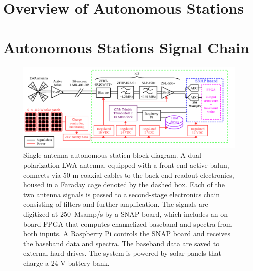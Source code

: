         \subsection{}
        \subsection{}
        
        
\newpage
    \section{Overview of Autonomous Stations}
    \section{Autonomous Stations Signal Chain}
    
    \begin{figure}
    	\begin{center}
    		\includegraphics[width=\linewidth]{Figures/albatros_single_schematic.pdf}
    		\caption{Single-antenna autonomous station block diagram.  A dual-polarization LWA antenna, equipped with a front-end active balun, connects via 50-m coaxial cables to the back-end readout electronics, housed in a Faraday cage denoted by the dashed box. Each of the two antenna signals is passed to a second-stage	electronics chain consisting of filters and further amplfication.  The signals are digitized at 250~Msamp/s by a SNAP board, which includes an on-board FPGA that computes channelized baseband and spectra from both inputs.  A Raspberry Pi controls the SNAP board and receives the baseband data and spectra.  The baseband data are saved to external hard drives. The system is powered by solar panels that charge a 24-V battery	bank.}
    		\label{Fig:albatros1_schem}
    	\end{center}
    \end{figure}
    
        \subsection{}
        \subsection{}
